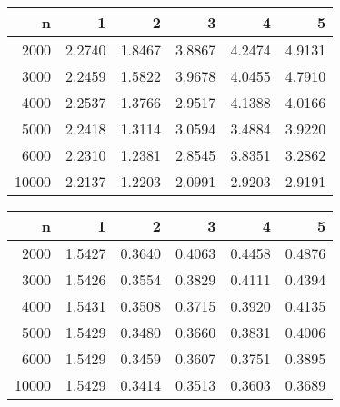 \begin{table}[ht]
\centering
\begin{tabular}{rrrrrr}
  \hline
n & 1 & 2 & 3 & 4 & 5 \\ 
  \hline
2000 & 2.2740 & 1.8467 & 3.8867 & 4.2474 & 4.9131 \\ 
  3000 & 2.2459 & 1.5822 & 3.9678 & 4.0455 & 4.7910 \\ 
  4000 & 2.2537 & 1.3766 & 2.9517 & 4.1388 & 4.0166 \\ 
  5000 & 2.2418 & 1.3114 & 3.0594 & 3.4884 & 3.9220 \\ 
  6000 & 2.2310 & 1.2381 & 2.8545 & 3.8351 & 3.2862 \\ 
  10000 & 2.2137 & 1.2203 & 2.0991 & 2.9203 & 2.9191 \\ 
   \hline
\end{tabular}
\end{table}
\begin{table}[ht]
\centering
\begin{tabular}{rrrrrr}
  \hline
n & 1 & 2 & 3 & 4 & 5 \\ 
  \hline
2000 & 1.5427 & 0.3640 & 0.4063 & 0.4458 & 0.4876 \\ 
  3000 & 1.5426 & 0.3554 & 0.3829 & 0.4111 & 0.4394 \\ 
  4000 & 1.5431 & 0.3508 & 0.3715 & 0.3920 & 0.4135 \\ 
  5000 & 1.5429 & 0.3480 & 0.3660 & 0.3831 & 0.4006 \\ 
  6000 & 1.5429 & 0.3459 & 0.3607 & 0.3751 & 0.3895 \\ 
  10000 & 1.5429 & 0.3414 & 0.3513 & 0.3603 & 0.3689 \\ 
   \hline
\end{tabular}
\end{table}
